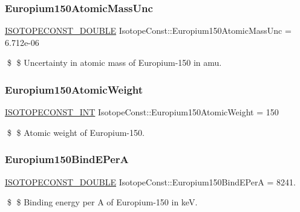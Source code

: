 \subsubsection{\texorpdfstring{Europium150\+Atomic\+Mass\+Unc}{Europium150AtomicMassUnc}}
{\footnotesize\ttfamily \mbox{\hyperlink{group___isotope_const-_macros_ga8f45a7272ce02c0b4c65c44636ed719a}{I\+S\+O\+T\+O\+P\+E\+C\+O\+N\+S\+T\+\_\+\+D\+O\+U\+B\+LE}} Isotope\+Const\+::\+Europium150\+Atomic\+Mass\+Unc = 6.\+712e-\/06}

\$ \$ Uncertainty in atomic mass of Europium-\/150 in amu. \mbox{\label{group___isotope_const-_europium-_eu150_ga22f2e439c51d2e430595bd47b1851b71}} 
\subsubsection{\texorpdfstring{Europium150\+Atomic\+Weight}{Europium150AtomicWeight}}
{\footnotesize\ttfamily \mbox{\hyperlink{group___isotope_const-_macros_ga5f18360b3e99483a35c32d789e62621c}{I\+S\+O\+T\+O\+P\+E\+C\+O\+N\+S\+T\+\_\+\+I\+NT}} Isotope\+Const\+::\+Europium150\+Atomic\+Weight = 150}

\$ \$ Atomic weight of Europium-\/150. \mbox{\label{group___isotope_const-_europium-_eu150_gacd6b9f1b09809d1734b2cc5c6638f357}} 
\subsubsection{\texorpdfstring{Europium150\+Bind\+E\+PerA}{Europium150BindEPerA}}
{\footnotesize\ttfamily \mbox{\hyperlink{group___isotope_const-_macros_ga8f45a7272ce02c0b4c65c44636ed719a}{I\+S\+O\+T\+O\+P\+E\+C\+O\+N\+S\+T\+\_\+\+D\+O\+U\+B\+LE}} Isotope\+Const\+::\+Europium150\+Bind\+E\+PerA = 8241.}

\$ \$ Binding energy per A of Europium-\/150 in keV. \mbox{\label{group___isotope_const-_europium-_eu150_gabaa0ddad860f2ac3d32d557bc1c9c9cb}} 

